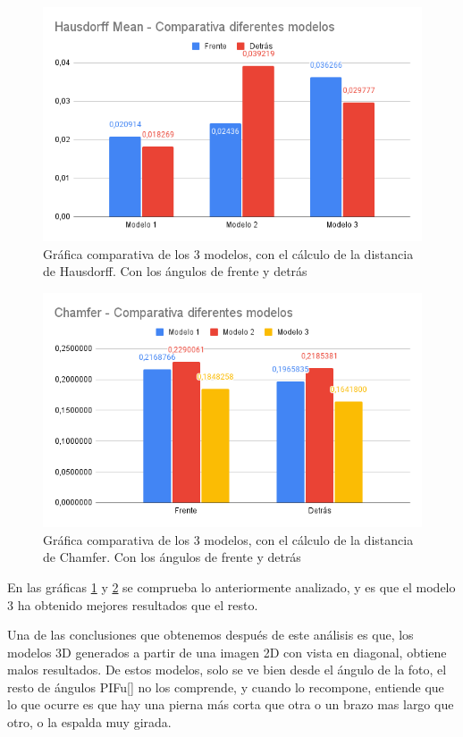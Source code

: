 \begin{figure}[H]
	\centering
	\includegraphics[scale=0.5]{imagenes/Hausdorff-difmods.png}
	\caption{Gráfica comparativa de los 3 modelos, con el cálculo de la distancia de Hausdorff. Con los ángulos de frente y detrás}
	\label{fig:haus}
\end{figure}
\begin{figure}[H]
	\centering
	\includegraphics[scale=0.5]{imagenes/Chamfer-difmods.png}
	\caption{Gráfica comparativa de los 3 modelos, con el cálculo de la distancia de Chamfer. Con los ángulos de frente y detrás}
	\label{fig:cham}
\end{figure}

En las gráficas \ref{fig:haus} y \ref{fig:cham} se comprueba lo anteriormente analizado, y es que el modelo 3 ha obtenido mejores resultados que el resto.

Una de las conclusiones que obtenemos después de este análisis es que, los modelos 3D generados a partir de una imagen 2D con vista en diagonal, obtiene malos resultados. De estos modelos, solo se ve bien desde el ángulo de la foto, el resto de ángulos PIFu[\cite{pifu}] no los comprende, y cuando lo recompone, entiende que lo que ocurre es que hay una pierna más corta que otra o un brazo mas largo que otro, o la espalda muy girada.

